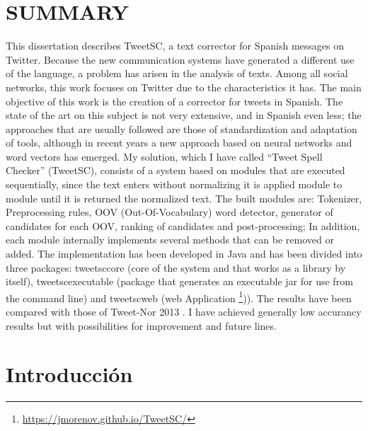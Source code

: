 \documentclass[spanish,12pt, a4paper,twoside]{paper}
\let\oldsection\section
\def\section{\cleardoublepage\oldsection}
\begin{document}
\section*{SUMMARY}
This dissertation describes TweetSC, a text corrector for Spanish messages on Twitter. Because the new communication systems have generated a different use of the language, a problem has arisen in the analysis of texts. Among all social networks, this work focuses on Twitter due to the characteristics it has. The main objective of this work is the creation of a corrector for tweets in Spanish. The state of the art on this subject is not very extensive, and in Spanish even less; the approaches that are usually followed are those of standardization and adaptation of tools, although in recent years a new approach based on neural networks and word vectors has emerged. My solution, which I have called ``Tweet Spell Checker'' (TweetSC), consists of a system based on modules that are executed sequentially, since the text enters without normalizing it is applied module to module until it is returned the normalized text. The built modules are: Tokenizer, Preprocessing rules, OOV (Out-Of-Vocabulary) word detector, generator of candidates for each OOV, ranking of candidates and post-processing; In addition, each module internally implements several methods that can be removed or added. The implementation has been developed in Java and has been divided into three packages: tweetsccore (core of the system and that works as a library by itself), tweetscexecutable (package that generates an executable jar for use from the command line) and tweetscweb (web Application \footnote{\url{https://jmorenov.github.io/TweetSC/}})). The results have been compared with those of Tweet-Nor 2013 \cite{alegria:2013}. I have achieved generally low accurancy results but with possibilities for improvement and future lines.


\tableofcontents %



\listoffigures
\listoftables



\newpage
{} 

\section{Introducción}\label{sec:introduccion}
\end{document}

